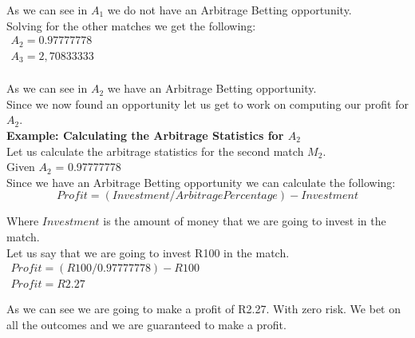 As we can see in $A_{1}$ we do not have an Arbitrage Betting opportunity. \\

Solving for the other matches we get the following: \\

\begin{math}
\begin{array}{l}
    A_{2} = 0.97777778 \\
    A_{3} = 2,70833333 \\
\end{array}
\end{math}

As we can see in $A_{2}$ we have an Arbitrage Betting opportunity. \\

Since we now found an opportunity let us get to work on computing our profit for $A_{2}$. \\

\textbf{Example: Calculating the Arbitrage Statistics for $A_{2}$} \\

Let us calculate the arbitrage statistics for the second match $M_{2}$. \\

Given $A_{2}$ = 0.97777778 \\ 

Since we have an Arbitrage Betting opportunity we can calculate the following: \\

\begin{equation}
    Profit = (Investment / ArbitragePercentage) - Investment
\end{equation}

Where $Investment$ is the amount of money that we are going to invest in the match. \\

Let us say that we are going to invest R100 in the match. \\

\begin{math}
\begin{array}{l}
    Profit = (R100 / 0.97777778) - R100 \\
    Profit = R2.27
\end{array}
\end{math}

As we can see we are going to make a profit of R2.27. With zero risk. We bet on all the outcomes and we are guaranteed to make a profit. \\

